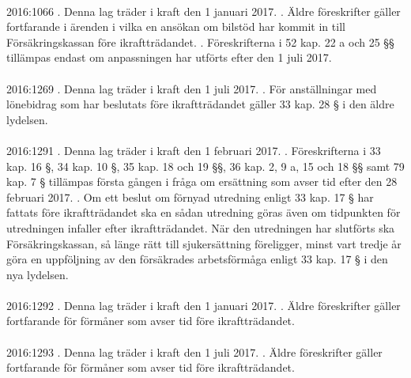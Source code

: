 \documentclass[a4paper,notitlepage,openany,10pt]{book}
\begin{document}
\paragraph*{}
2016:1066
. Denna lag träder i kraft den 1 januari 2017.
. Äldre föreskrifter gäller fortfarande i ärenden i vilka en ansökan om bilstöd har kommit in till Försäkringskassan före ikraftträdandet.
. Föreskrifterna i 52 kap. 22 a och 25 §§ tillämpas endast om anpassningen har utförts efter den 1 juli 2017.
\paragraph*{}
2016:1269
. Denna lag träder i kraft den 1 juli 2017.
. För anställningar med lönebidrag som har beslutats före ikraftträdandet gäller 33 kap. 28 § i den äldre lydelsen.
\paragraph*{}
2016:1291
. Denna lag träder i kraft den 1 februari 2017.
. Föreskrifterna i 33 kap. 16 §, 34 kap. 10 §, 35 kap. 18 och 19 §§, 36 kap. 2, 9 a, 15 och 18 §§ samt 79 kap. 7 § tillämpas första gången i fråga om ersättning som avser tid efter den 28 februari 2017.
. Om ett beslut om förnyad utredning enligt 33 kap. 17 § har fattats före ikraftträdandet ska en sådan utredning göras även om tidpunkten för utredningen infaller efter ikraftträdandet. När den utredningen har slutförts ska Försäkringskassan, så länge rätt till sjukersättning föreligger, minst vart tredje år göra en uppföljning av den försäkrades arbetsförmåga enligt 33 kap. 17 § i den nya lydelsen.
\paragraph*{}
2016:1292
. Denna lag träder i kraft den 1 januari 2017.
. Äldre föreskrifter gäller fortfarande för förmåner som avser tid före ikraftträdandet.
\paragraph*{}
2016:1293
. Denna lag träder i kraft den 1 juli 2017.
. Äldre föreskrifter gäller fortfarande för förmåner som avser tid före ikraftträdandet.
\end{document}
